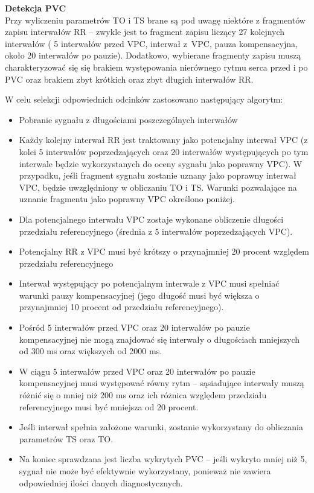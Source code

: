 \documentclass[a4paper, 11pt]{article}
\begin{document}
\textbf{Detekcja PVC}\\
Przy wyliczeniu parametrów TO i TS brane są pod uwagę niektóre z fragmentów zapisu interwałów RR  -- zwykle jest to fragment zapisu liczący 27 kolejnych 
interwałów ( 5 interwałów przed VPC, interwał z~VPC, pauza kompensacyjna,
około 20 interwałów po pauzie). Dodatkowo, wybierane fragmenty zapisu muszą  charakteryzować się się brakiem występowania nierównego rytmu serca przed i po PVC oraz brakiem zbyt krótkich oraz zbyt długich interwałów RR.
\par W celu selekcji odpowiednich odcinków zastosowano następujący algorytm:
\begin{itemize}
\item Pobranie sygnału z długościami poszczególnych interwałów
\item Każdy kolejny interwał RR jest traktowany jako
potencjalny interwał VPC (z kolei 5 interwałów poprzedzających oraz 20 interwałów występujących po tym interwale będzie wykorzystanych do oceny
sygnału jako poprawny VPC). 
W przypadku, jeśli fragment sygnału zostanie uznany jako poprawny
interwał VPC, będzie uwzględniony w obliczaniu TO i TS.
Warunki pozwalające na uznanie fragmentu jako poprawny VPC określono poniżej.
\item Dla potencjalnego interwału VPC zostaje wykonane obliczenie długości przedziału referencyjnego 
(średnia z  5 interwałów poprzedzających VPC).
\item Potencjalny RR z VPC musi być 
krótszy o przynajmniej 20 procent względem przedziału referencyjnego
\item Interwał występujący po potencjalnym interwale z VPC musi spełniać 
warunki pauzy kompensacyjnej (jego długość musi być większa o przynajmniej 10 procent od przedziału referencyjnego).
\item Pośród 5 interwałów przed VPC
oraz 20 interwałów po pauzie kompensacyjnej nie mogą znajdować się
interwały o długościach
mniejszych od 300 ms oraz większych od 2000 ms.
\item W ciągu 5 interwałów przed VPC
oraz 20 interwałów po pauzie kompensacyjnej musi występować
równy rytm  -- sąsiadujące interwały muszą różnić się o mniej
niż 200 ms oraz ich różnica względem przedziału referencyjnego musi być mniejsza
od 20 procent.
\item Jeśli interwał spełnia założone warunki, zostanie 
wykorzystany do obliczania parametrów TS oraz TO.
\item Na koniec sprawdzana jest liczba wykrytych 
PVC -- jeśli wykryto mniej niż 5, sygnał nie może być efektywnie 
wykorzystany, ponieważ nie zawiera odpowiedniej ilości
danych diagnostycznych. 
\end{itemize}
\end{document}
